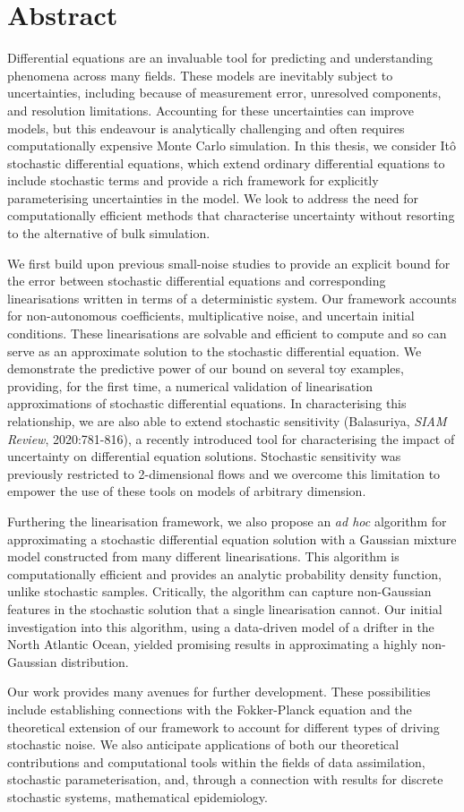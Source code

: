 \chapter{Abstract}
\small
Differential equations are an invaluable tool for predicting and understanding phenomena across many fields.
These models are inevitably subject to uncertainties, including because of measurement error, unresolved components, and resolution limitations.
Accounting for these uncertainties can improve models, but this endeavour is analytically challenging and often requires computationally expensive Monte Carlo simulation.
In this thesis, we consider It\^o stochastic differential equations, which extend ordinary differential equations to include stochastic terms and provide a rich framework for explicitly parameterising uncertainties in the model.
We look to address the need for computationally efficient methods that characterise uncertainty without resorting to the alternative of bulk simulation.

We first build upon previous small-noise studies to provide an explicit bound for the error between stochastic differential equations and corresponding linearisations written in terms of a deterministic system.
Our framework accounts for non-autonomous coefficients, multiplicative noise, and uncertain initial conditions.
These linearisations are solvable and efficient to compute and so can serve as an approximate solution to the stochastic differential equation.
We demonstrate the predictive power of our bound on several toy examples, providing, for the first time, a numerical validation of linearisation approximations of stochastic differential equations.
In characterising this relationship, we are also able to extend stochastic sensitivity (Balasuriya, \emph{SIAM Review}, 2020:781-816), a recently introduced tool for characterising the impact of uncertainty on differential equation solutions.
Stochastic sensitivity was previously restricted to 2-dimensional flows and we overcome this limitation to empower the use of these tools on models of arbitrary dimension.

Furthering the linearisation framework, we also propose an \emph{ad hoc} algorithm for approximating a stochastic differential equation solution with a Gaussian mixture model constructed from many different linearisations.
This algorithm is computationally efficient and provides an analytic probability density function, unlike stochastic samples.
Critically, the algorithm can capture non-Gaussian features in the stochastic solution that a single linearisation cannot.
Our initial investigation into this algorithm, using a data-driven model of a drifter in the North Atlantic Ocean, yielded promising results in approximating a highly non-Gaussian distribution.

Our work provides many avenues for further development.
These possibilities include establishing connections with the Fokker-Planck equation and the theoretical extension of our framework to account for different types of driving stochastic noise.
We also anticipate applications of both our theoretical contributions and computational tools within the fields of data assimilation, stochastic parameterisation, and, through a connection with results for discrete stochastic systems, mathematical epidemiology.
